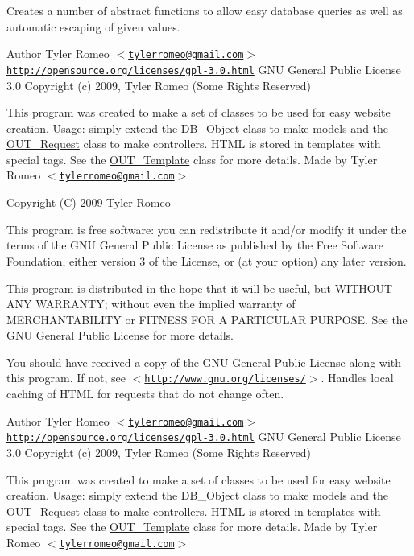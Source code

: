 Creates a number of abstract functions to allow easy database queries as well as automatic escaping of given values.

\begin{DoxyAuthor}{Author}
Tyler Romeo $<$\href{mailto:tylerromeo@gmail.com}{\tt tylerromeo@gmail.com}$>$  \href{http://opensource.org/licenses/gpl-3.0.html}{\tt http://opensource.org/licenses/gpl-\/3.0.html} GNU General Public License 3.0  Copyright (c) 2009, Tyler Romeo (Some Rights Reserved)
\end{DoxyAuthor}
This program was created to make a set of classes to be used for easy website creation. Usage: simply extend the DB\_\-Object class to make models and the \hyperlink{classOUT__Request}{OUT\_\-Request} class to make controllers. HTML is stored in templates with special tags. See the \hyperlink{classOUT__Template}{OUT\_\-Template} class for more details. Made by Tyler Romeo $<$\href{mailto:tylerromeo@gmail.com}{\tt tylerromeo@gmail.com}$>$

Copyright (C) 2009 Tyler Romeo

This program is free software: you can redistribute it and/or modify it under the terms of the GNU General Public License as published by the Free Software Foundation, either version 3 of the License, or (at your option) any later version.

This program is distributed in the hope that it will be useful, but WITHOUT ANY WARRANTY; without even the implied warranty of MERCHANTABILITY or FITNESS FOR A PARTICULAR PURPOSE. See the GNU General Public License for more details.

You should have received a copy of the GNU General Public License along with this program. If not, see $<$\href{http://www.gnu.org/licenses/}{\tt http://www.gnu.org/licenses/}$>$. Handles local caching of HTML for requests that do not change often.

\begin{DoxyAuthor}{Author}
Tyler Romeo $<$\href{mailto:tylerromeo@gmail.com}{\tt tylerromeo@gmail.com}$>$  \href{http://opensource.org/licenses/gpl-3.0.html}{\tt http://opensource.org/licenses/gpl-\/3.0.html} GNU General Public License 3.0  Copyright (c) 2009, Tyler Romeo (Some Rights Reserved)
\end{DoxyAuthor}
This program was created to make a set of classes to be used for easy website creation. Usage: simply extend the DB\_\-Object class to make models and the \hyperlink{classOUT__Request}{OUT\_\-Request} class to make controllers. HTML is stored in templates with special tags. See the \hyperlink{classOUT__Template}{OUT\_\-Template} class for more details. Made by Tyler Romeo $<$\href{mailto:tylerromeo@gmail.com}{\tt tylerromeo@gmail.com}$>$

